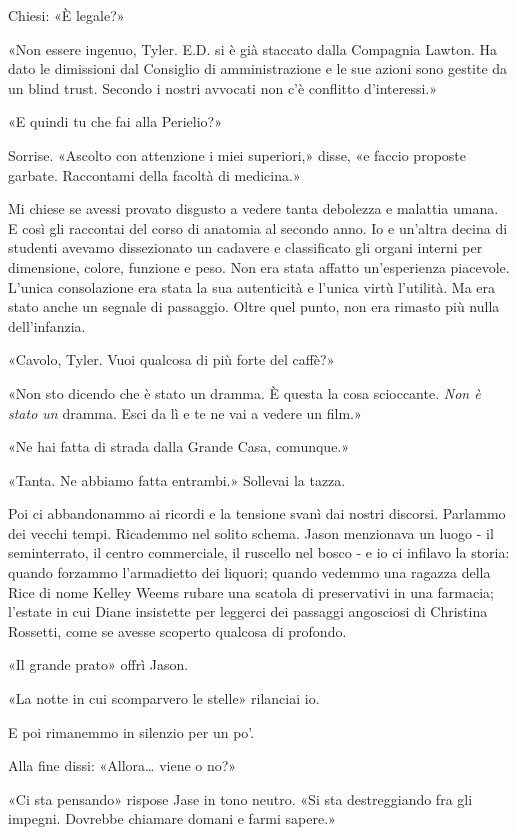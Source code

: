 Chiesi: «È legale?»

«Non essere ingenuo, Tyler. E.D. si è già staccato dalla Compagnia
Lawton. Ha dato le dimissioni dal Consiglio di amministrazione e le sue
azioni sono gestite da un blind trust. Secondo i nostri avvocati non c'è
conflitto d'interessi.»

«E quindi tu che fai alla Perielio?»

Sorrise. «Ascolto con attenzione i miei superiori,» disse, «e faccio
proposte garbate. Raccontami della facoltà di medicina.»

Mi chiese se avessi provato disgusto a vedere tanta debolezza e malattia
umana. E così gli raccontai del corso di anatomia al secondo anno. Io e
un'altra decina di studenti avevamo dissezionato un cadavere e
classificato gli organi interni per dimensione, colore, funzione e peso.
Non era stata affatto un'esperienza piacevole. L'unica consolazione era
stata la sua autenticità e l'unica virtù l'utilità. Ma era stato anche
un segnale di passaggio. Oltre quel punto, non era rimasto più nulla
dell'infanzia.

«Cavolo, Tyler. Vuoi qualcosa di più forte del caffè?»

«Non sto dicendo che è stato un dramma. È questa la cosa scioccante.
\emph{Non è stato un} dramma. Esci da lì e te ne vai a vedere un film.»

«Ne hai fatta di strada dalla Grande Casa, comunque.»

«Tanta. Ne abbiamo fatta entrambi.» Sollevai la tazza.

Poi ci abbandonammo ai ricordi e la tensione svanì dai nostri discorsi.
Parlammo dei vecchi tempi. Ricademmo nel solito schema. Jason menzionava
un luogo - il seminterrato, il centro commerciale, il ruscello nel bosco
- e io ci infilavo la storia: quando forzammo l'armadietto dei liquori;
quando vedemmo una ragazza della Rice di nome Kelley Weems rubare una
scatola di preservativi in una farmacia; l'estate in cui Diane
insistette per leggerci dei passaggi angosciosi di Christina Rossetti,
come se avesse scoperto qualcosa di profondo.

«Il grande prato» offrì Jason.

«La notte in cui scomparvero le stelle» rilanciai io.

E poi rimanemmo in silenzio per un po'.

Alla fine dissi: «Allora\ldots{} viene o no?»

«Ci sta pensando» rispose Jase in tono neutro. «Si sta destreggiando fra
gli impegni. Dovrebbe chiamare domani e farmi sapere.»

